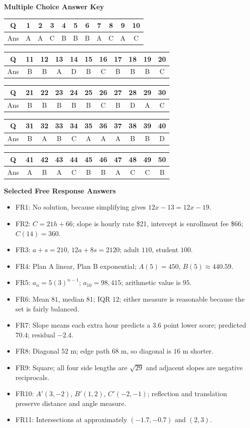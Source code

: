 \documentclass[11pt]{article}
\renewcommand{\arraystretch}{1.18}
\begin{document}
\textbf{Multiple Choice Answer Key}
\begin{center}
\renewcommand{\arraystretch}{1.2}
\begin{tabular}{|c|cccccccccc|}
\hline
Q & 1&2&3&4&5&6&7&8&9&10\\ \hline
Ans & A&A&C&B&B&B&A&C&A&C\\ \hline
\end{tabular}

\begin{tabular}{|c|cccccccccc|}
\hline
Q & 11&12&13&14&15&16&17&18&19&20\\ \hline
Ans & B&B&A&D&B&C&B&B&B&C\\ \hline
\end{tabular}

\begin{tabular}{|c|cccccccccc|}
\hline
Q & 21&22&23&24&25&26&27&28&29&30\\ \hline
Ans & B&B&B&B&B&C&B&D&A&C\\ \hline
\end{tabular}

\begin{tabular}{|c|cccccccccc|}
\hline
Q & 31&32&33&34&35&36&37&38&39&40\\ \hline
Ans & B&A&B&C&A&A&A&B&B&D\\ \hline
\end{tabular}

\begin{tabular}{|c|cccccccccc|}
\hline
Q & 41&42&43&44&45&46&47&48&49&50\\ \hline
Ans & A&B&A&C&B&B&A&C&C&B\\ \hline
\end{tabular}
\end{center}

\textbf{Selected Free Response Answers}
\begin{itemize}
\item FR1: No solution, because simplifying gives $12x-13=12x-19$.
\item FR2: $C=21h+66$; slope is hourly rate \$21, intercept is enrollment fee \$66; $C(14)=360$.
\item FR3: $a+s=210$, $12a+8s=2120$; adult $110$, student $100$.
\item FR4: Plan A linear, Plan B exponential; $A(5)=450$, $B(5)\approx440.59$.
\item FR5: $a_n=5(3)^{n-1}$; $a_{10}=98,415$; arithmetic value is $95$.
\item FR6: Mean $81$, median $81$; IQR $12$; either measure is reasonable because the set is fairly balanced.
\item FR7: Slope means each extra hour predicts a $3.6$ point lower score; predicted $70.4$; residual $-2.4$.
\item FR8: Diagonal $52$ m; edge path $68$ m, so diagonal is $16$ m shorter.
\item FR9: Square; all four side lengths are $\sqrt{29}$ and adjacent slopes are negative reciprocals.
\item FR10: $A'(3,-2)$, $B'(1,2)$, $C'(-2,-1)$; reflection and translation preserve distance and angle measure.
\item FR11: Intersections at approximately $(-1.7,-0.7)$ and $(2,3)$.
\end{itemize}
\end{document}
